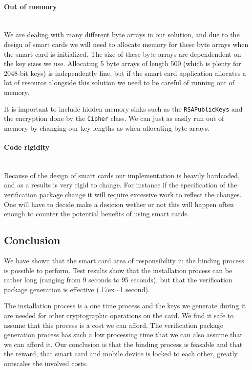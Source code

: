 \paragraph{Out of memory}\mbox{}\\
We are dealing with many different byte arrays in our solution, and due to the design of smart cards we will need to allocate memory for these byte arrays when the smart card is initialized. The size of these byte arrays are dependendent on the key sizes we use. Allocating 5 byte arrays of length 500 (which is plenty for 2048-bit keys) is independently fine, but if the smart card application allocates a lot of resource alongside this solution we need to be careful of running out of memory.

It is important to include hidden memory sinks such as the \texttt{RSAPublicKeys} and the encryption done by the \texttt{Cipher} class. We can just as easily run out of memory by changing our key lengths as when allocating byte arrays.

\paragraph{Code rigidity}\mbox{}\\
Because of the design of smart cards our implementation is heavily hardcoded, and as a results is very rigid to change. For instance if the specification of the verification package change it will require excessive work to reflect the changes. One will have to decide make a desicion wether or not this will happen often enough to counter the potential benefits of using smart cards.

\subsection{Conclusion}
We have shown that the smart card area of responsibility in the binding process is possible to perform. Test results show that the installation process can be rather long (ranging from 9 seconds to 95 seconds), but that the verification package generation is effective ({\raise.17ex\hbox{$\scriptstyle\sim$}}1 second).

The installation process is a one time process and the keys we generate during it are needed for other cryptographic operations on the card. We find it safe to assume that this process is a cost we can afford. The verification package generation process has such a low processing time that we can also assume that we can afford it. Our conclusion is that the binding process is feasable and that the reward, that smart card and mobile device is locked to each other, greatly outscales the involved costs.
